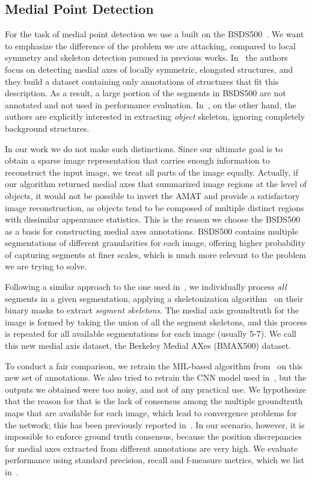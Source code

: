 \documentclass[10pt,twocolumn,letterpaper]{article}
\begin{document}
\subsection{Medial Point Detection}\label{sec:experiments:detection}
For the task of medial point detection we use a built on the BSDS500~\cite{martin2001database,arbelaez2011contour}.
We want to emphasize the difference of the problem we are attacking, compared to local symmetry
and skeleton detection pursued in previous works.
In~\cite{tsogkas2012learning} the authors focus on detecting medial axes of locally symmetric, elongated structures,
and they build a dataset containing only annotations of structures that fit this description.
As a result, a large portion of the segments in BSDS500 are not annotated and not used in performance evaluation.
In~\cite{shen2016object}, on the other hand, the authors are explicitly interested in extracting \emph{object}
skeleton, ignoring completely background structures.

In our work we do not make such distinctions. Since our ultimate goal is to obtain a sparse image representation
that carries enough information to reconstruct the input image, we treat all parts of the image equally.
Actually, if our algorithm returned medial axes that summarized image regions at the level of objects, 
it would not be possible to invert the AMAT and provide a satisfactory image reconstruction, as objects tend to
be composed of multiple distinct regions with dissimilar appearance statistics.
This is the reason we choose the BSDS500 as a basis for constructing medial axes annotations.
BSDS500 contains multiple segmentations of different granularities for each image, offering higher probability of
capturing segments at finer scales, which is much more relevant to the problem we are trying to solve.

Following a similar approach to the one used in~\cite{tsogkas2012learning,shen2016object}, 
we individually process \emph{all} segments in a given segmentation, applying a skeletonization 
algorithm~\cite{telea2002augmented} on their binary masks to extract \emph{segment skeletons}.
The medial axis groundtruth for the image is formed by taking the union of all the segment skeletons, and this
process is repeated for all available segmentations for each image (usually 5-7).
We call this new medial axis dataset, the Berkeley Medial AXes (BMAX500) dataset.

To conduct a fair comparison, we retrain the MIL-based algorithm from~\cite{tsogkas2012learning} on this new set 
of annotations.
We also tried to retrain the CNN model used in~\cite{shen2016object}, but the outputs we obtained were too noisy, 
and not of any practical use.
We hypothesize that the reason for that is the lack of consensus among the multiple groundtruth maps that are
available for each image, which lead to convergence problems for the network; this has been previously
reported in~\cite{xie2015holistically}.
In our scenario, however, it is impossible to enforce ground truth consensus, because the position discrepancies
for medial axes extracted from different annotations are very high.
We evaluate performance using standard precision, recall and f-measure metrics, 
which we list in~.
\end{document}
